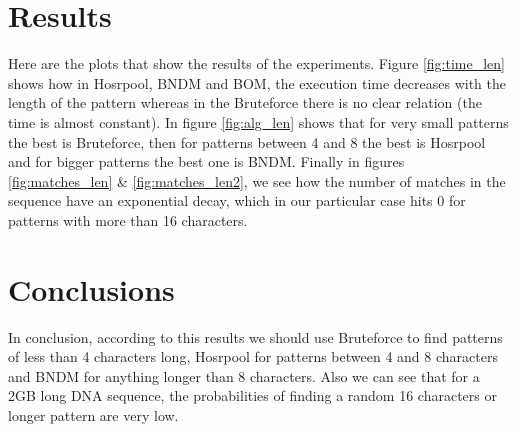 \documentclass[conference,a4paper]{IEEEtran}
\begin{document}
\section{Results}
Here are the plots that show the results of the experiments. Figure \ref{fig:time_len} shows how in Hosrpool, BNDM and BOM, the execution time decreases with the length of the pattern whereas in the Bruteforce there is no clear relation (the time is almost constant). In figure \ref{fig:alg_len} shows that for very small patterns the best is Bruteforce, then for patterns between 4 and 8 the best is Hosrpool and for bigger patterns the best one is BNDM. Finally in figures \ref{fig:matches_len} \& \ref{fig:matches_len2}, we see how the number of matches in the sequence have an exponential decay, which in our particular case hits 0 for patterns with more than 16 characters.

\section{Conclusions}
In conclusion, according to this results we should use Bruteforce to find patterns of less than 4 characters long, Hosrpool for patterns between 4 and 8 characters and BNDM for anything longer than 8 characters. Also we can see that for a 2GB long DNA sequence, the probabilities of finding a random 16 characters or longer pattern are very low.
\end{document}
